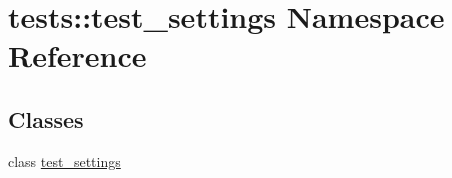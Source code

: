 \hypertarget{namespacetests_1_1test__settings}{\section{tests\-:\-:test\-\_\-settings \-Namespace \-Reference}
\label{namespacetests_1_1test__settings}
}
\subsection*{\-Classes}
\begin{DoxyCompactItemize}
\item 
class \hyperlink{classtests_1_1test__settings_1_1test__settings}{test\-\_\-settings}
\end{DoxyCompactItemize}
